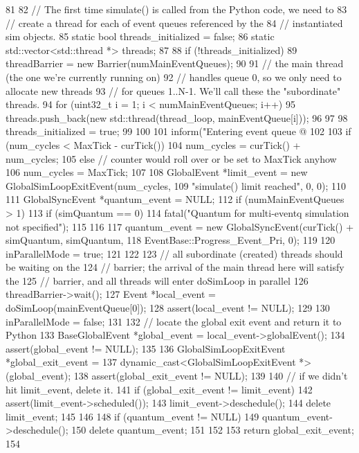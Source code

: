 \begin{DoxyCode}
81 {
82     // The first time simulate() is called from the Python code, we need to
83     // create a thread for each of event queues referenced by the
84     // instantiated sim objects.
85     static bool threads_initialized = false;
86     static std::vector<std::thread *> threads;
87 
88     if (!threads_initialized) {
89         threadBarrier = new Barrier(numMainEventQueues);
90 
91         // the main thread (the one we're currently running on)
92         // handles queue 0, so we only need to allocate new threads
93         // for queues 1..N-1.  We'll call these the "subordinate" threads.
94         for (uint32_t i = 1; i < numMainEventQueues; i++) {
95             threads.push_back(new std::thread(thread_loop, mainEventQueue[i]));
96         }
97 
98         threads_initialized = true;
99     }
100 
101     inform("Entering event queue @ %
102 
103     if (num_cycles < MaxTick - curTick())
104         num_cycles = curTick() + num_cycles;
105     else // counter would roll over or be set to MaxTick anyhow
106         num_cycles = MaxTick;
107 
108     GlobalEvent *limit_event = new GlobalSimLoopExitEvent(num_cycles,
109                                 "simulate() limit reached", 0, 0);
110 
111     GlobalSyncEvent *quantum_event = NULL;
112     if (numMainEventQueues > 1) {
113         if (simQuantum == 0) {
114             fatal("Quantum for multi-eventq simulation not specified");
115         }
116 
117         quantum_event = new GlobalSyncEvent(curTick() + simQuantum, simQuantum,
118                             EventBase::Progress_Event_Pri, 0);
119 
120         inParallelMode = true;
121     }
122 
123     // all subordinate (created) threads should be waiting on the
124     // barrier; the arrival of the main thread here will satisfy the
125     // barrier, and all threads will enter doSimLoop in parallel
126     threadBarrier->wait();
127     Event *local_event = doSimLoop(mainEventQueue[0]);
128     assert(local_event != NULL);
129 
130     inParallelMode = false;
131 
132     // locate the global exit event and return it to Python
133     BaseGlobalEvent *global_event = local_event->globalEvent();
134     assert(global_event != NULL);
135 
136     GlobalSimLoopExitEvent *global_exit_event =
137         dynamic_cast<GlobalSimLoopExitEvent *>(global_event);
138     assert(global_exit_event != NULL);
139 
140     // if we didn't hit limit_event, delete it.
141     if (global_exit_event != limit_event) {
142         assert(limit_event->scheduled());
143         limit_event->deschedule();
144         delete limit_event;
145     }
146 
148     if (quantum_event != NULL) {
149         quantum_event->deschedule();
150         delete quantum_event;
151     }
152 
153     return global_exit_event;
154 }
\end{DoxyCode}
